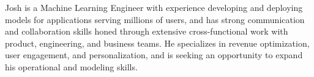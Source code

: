 

\begin{cvparagraph}

Josh is a Machine Learning Engineer with experience developing and deploying models for applications serving millions of users, and has strong communication and collaboration skills honed through extensive cross-functional work with product, engineering, and business teams. He specializes in revenue optimization, user engagement, and personalization, and is seeking an opportunity to expand his operational and modeling skills. 
\end{cvparagraph}
